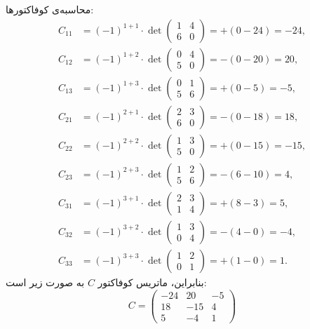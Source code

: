 \begin{scriptsize}
\begin{example}
	محاسبه‌ی کوفاکتورها:
	\[
	\begin{aligned}
		C_{11} &= (-1)^{1+1} \cdot \det \begin{pmatrix} 1 & 4 \\ 6 & 0 \end{pmatrix} = +(0 - 24) = -24, \\
		C_{12} &= (-1)^{1+2} \cdot \det \begin{pmatrix} 0 & 4 \\ 5 & 0 \end{pmatrix} = -(0 - 20) = 20, \\
		C_{13} &= (-1)^{1+3} \cdot \det \begin{pmatrix} 0 & 1 \\ 5 & 6 \end{pmatrix} = +(0 - 5) = -5, \\
		C_{21} &= (-1)^{2+1} \cdot \det \begin{pmatrix} 2 & 3 \\ 6 & 0 \end{pmatrix} = -(0 - 18) = 18, \\
		C_{22} &= (-1)^{2+2} \cdot \det \begin{pmatrix} 1 & 3 \\ 5 & 0 \end{pmatrix} = +(0 - 15) = -15, \\
		C_{23} &= (-1)^{2+3} \cdot \det \begin{pmatrix} 1 & 2 \\ 5 & 6 \end{pmatrix} = -(6 - 10) = 4, \\
		C_{31} &= (-1)^{3+1} \cdot \det \begin{pmatrix} 2 & 3 \\ 1 & 4 \end{pmatrix} = +(8 - 3) = 5, \\
		C_{32} &= (-1)^{3+2} \cdot \det \begin{pmatrix} 1 & 3 \\ 0 & 4 \end{pmatrix} = -(4 - 0) = -4, \\
		C_{33} &= (-1)^{3+3} \cdot \det \begin{pmatrix} 1 & 2 \\ 0 & 1 \end{pmatrix} = +(1 - 0) = 1.
	\end{aligned}
	\]
	بنابراین، ماتریس کوفاکتور \( C \) به صورت زیر است:
	\[
	C = \begin{pmatrix}
		-24 & 20 & -5 \\
		18 & -15 & 4 \\
		5 & -4 & 1
	\end{pmatrix}
	\]
	


\end{example}
\end{scriptsize}
